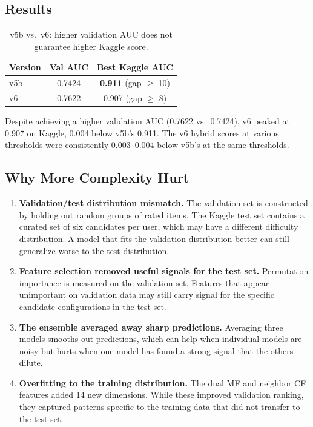 \documentclass[12pt]{article}
\begin{document}
\newpage
\subsection{Results}

\begin{table}[H]
	\centering
	\begin{tabular}{lcc}
		\toprule
		\textbf{Version} & \textbf{Val AUC} & \textbf{Best Kaggle AUC} \\
		\midrule
		v5b  & 0.7424 & \textbf{0.911} (gap $\geq$ 10) \\
		v6   & 0.7622 & 0.907 (gap $\geq$ 8) \\
		\bottomrule
	\end{tabular}
	\caption{v5b vs.\ v6: higher validation AUC does not guarantee higher Kaggle score.}\label{tab:v5v6}
\end{table}

Despite achieving a higher validation AUC (0.7622 vs.\ 0.7424), v6 peaked at 0.907 on Kaggle, 0.004 below v5b's 0.911. The v6 hybrid scores at various thresholds were consistently 0.003--0.004 below v5b's at the same thresholds.

\subsection{Why More Complexity Hurt}

\begin{enumerate}
	\item \textbf{Validation/test distribution mismatch.} The validation set is constructed by holding out random groups of rated items. The Kaggle test set contains a curated set of six candidates per user, which may have a different difficulty distribution. A model that fits the validation distribution better can still generalize worse to the test distribution.

	\item \textbf{Feature selection removed useful signals for the test set.} Permutation importance is measured on the validation set. Features that appear unimportant on validation data may still carry signal for the specific candidate configurations in the test set.

	\item \textbf{The ensemble averaged away sharp predictions.} Averaging three models smooths out predictions, which can help when individual models are noisy but hurts when one model has found a strong signal that the others dilute.

	\item \textbf{Overfitting to the training distribution.} The dual MF and neighbor CF features added 14 new dimensions. While these improved validation ranking, they captured patterns specific to the training data that did not transfer to the test set.
\end{enumerate}
\end{document}
